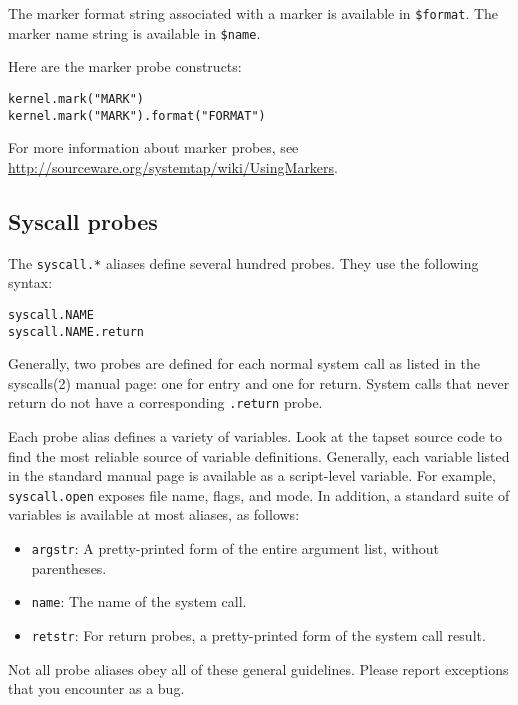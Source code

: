 \documentclass[twoside,english]{article}
\newenvironment{vindent}
{\begin{list}{}{\setlength{\listparindent}{6pt}}
\item[]}
{\end{list}}
\begin{document}
The marker format string associated with a marker is available in
\texttt{\$format}. The marker name string is available in
\texttt{\$name}.

Here are the marker probe constructs:
\begin{vindent}
\begin{verbatim}
kernel.mark("MARK")
kernel.mark("MARK").format("FORMAT")
\end{verbatim}
\end{vindent}

For more information about marker probes, see
\url{http://sourceware.org/systemtap/wiki/UsingMarkers}.


\subsection{Syscall probes}
\label{sec:syscall}
The \texttt{syscall.*}  aliases define several hundred probes.  They
use the following syntax:
\begin{vindent}
\begin{verbatim}
syscall.NAME
syscall.NAME.return
\end{verbatim}
\end{vindent}

Generally, two probes are defined for each normal system call as
listed in the syscalls(2) manual page: one for entry and one for
return.   System calls that never return do not have a
corresponding \texttt{.return} probe.

Each probe alias defines a variety of variables. Look at the tapset
source code to find the most reliable source of variable definitions.
Generally, each variable listed in the standard manual page is
available as a script-level variable. For example,
\texttt{syscall.open} exposes file name, flags, and mode.  In addition,
a standard suite of variables is available at most aliases, as follows:

\begin{itemize}
\item \texttt{argstr}: A pretty-printed form of the entire argument
  list, without parentheses.
\item \texttt{name}: The name of the system call.
\item \texttt{retstr}: For return probes, a pretty-printed form of the
  system call result.
\end{itemize}

Not all probe aliases obey all of these general guidelines.  Please
report exceptions that you encounter as a bug.
\end{document}
